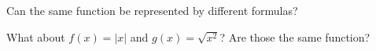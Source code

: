 \documentclass{ximera}
\begin{document}
\begin{problem}
  Can the same function be represented by different formulas?

  \begin{multipleChoice}
  \end{multipleChoice}

  \begin{problem}
    What about $f(x) = |x|$ and $g(x) = \sqrt{x^2}$?  Are those the same function?

    \begin{multipleChoice}
    \end{multipleChoice}
  \end{problem}
\end{problem}




\end{document}
